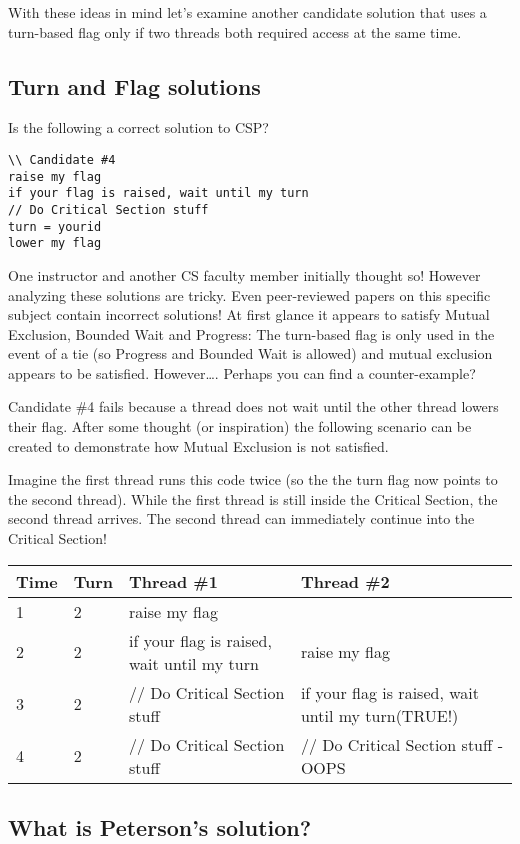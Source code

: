 With these ideas in mind let's examine another candidate solution that
uses a turn-based flag only if two threads both required access at the
same time.

\subsection{Turn and Flag solutions}\label{turn-and-flag-solutions}

Is the following a correct solution to CSP?

\begin{verbatim}
\\ Candidate #4
raise my flag
if your flag is raised, wait until my turn
// Do Critical Section stuff
turn = yourid
lower my flag
\end{verbatim}

One instructor and another CS faculty member initially thought so!
However analyzing these solutions are tricky. Even peer-reviewed papers
on this specific subject contain incorrect solutions! At first glance it
appears to satisfy Mutual Exclusion, Bounded Wait and Progress: The
turn-based flag is only used in the event of a tie (so Progress and
Bounded Wait is allowed) and mutual exclusion appears to be satisfied.
However\ldots{}. Perhaps you can find a counter-example?

Candidate \#4 fails because a thread does not wait until the other
thread lowers their flag. After some thought (or inspiration) the
following scenario can be created to demonstrate how Mutual Exclusion is
not satisfied.

Imagine the first thread runs this code twice (so the the turn flag now
points to the second thread). While the first thread is still inside the
Critical Section, the second thread arrives. The second thread can
immediately continue into the Critical Section!

\begin{longtable}[c]{@{}llll@{}}
\toprule
Time & Turn & Thread \#1 & Thread \#2\tabularnewline
\midrule
\endhead
1 & 2 & raise my flag\tabularnewline
2 & 2 & if your flag is raised, wait until my turn & raise my
flag\tabularnewline
3 & 2 & // Do Critical Section stuff & if your flag is raised, wait
until my turn(TRUE!)\tabularnewline
4 & 2 & // Do Critical Section stuff & // Do Critical Section stuff -
OOPS\tabularnewline
\bottomrule
\end{longtable}

\subsection{What is Peterson's
solution?}\label{what-is-petersons-solution}

